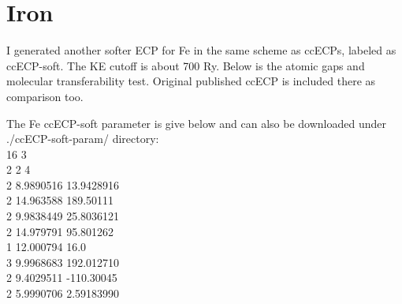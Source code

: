 \section{Iron}

I generated another softer ECP for Fe in the same scheme as ccECPs, labeled as ccECP-soft. The KE cutoff is about 700 Ry. Below is the atomic gaps and molecular transferability test. Original published ccECP is included there as comparison too.

The Fe ccECP-soft parameter is give below and can also be downloaded under ./ccECP-soft-param/ directory:\\
16 3  \\
2 2 4 \\
2 8.9890516 13.9428916  \\  
2 14.963588  189.50111  \\
2 9.9838449 25.8036121  \\
2 14.979791  95.801262  \\
1 12.000794  16.0  \\
3 9.9968683 192.012710  \\
2 9.4029511 -110.30045  \\
2 5.9990706 2.59183990  \\

